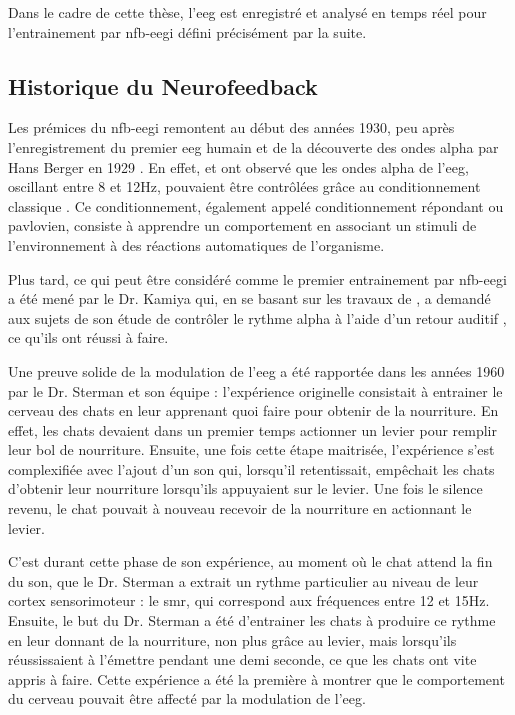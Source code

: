 Dans le cadre de cette thèse, l'\gls{eeg} est enregistré et analysé en temps réel pour l'entrainement par \gls{nfb}-\gls{eegi} défini précisément par la suite.  
 

\subsection{Historique du Neurofeedback}

Les prémices du \gls{nfb}-\gls{eegi} remontent au début des années 1930, peu après l'enregistrement du premier \gls{eeg} humain et de la découverte des ondes alpha par Hans Berger en 1929 \citep{Berger1929}.
En effet, \citet{Durup1935} et \citet{Loomis1936} ont observé que les ondes alpha de l'\gls{eeg}, oscillant entre 8 et 12Hz, pouvaient être contrôlées grâce au 
conditionnement classique \citep{Pavlov1929}. Ce conditionnement, également appelé conditionnement répondant ou pavlovien, consiste à apprendre un comportement en associant un stimuli
de l'environnement à des réactions automatiques de l'organisme.

Plus tard, ce qui peut être considéré comme le premier entrainement par \gls{nfb}-\gls{eegi} a été mené par le Dr. Kamiya qui, en se basant sur les travaux de \citet{Durup1935}, 
a demandé aux sujets de son étude de contrôler le rythme alpha à l'aide d'un retour auditif \citep{Kamiya1969}, ce qu'ils ont réussi à faire. 

Une preuve solide de la modulation de l'\gls{eeg} a été rapportée dans les années 1960 par le Dr. Sterman et son équipe \citep{Sterman1969} : l'expérience 
originelle consistait à entrainer le cerveau des chats en leur apprenant quoi faire pour obtenir de 
la nourriture. En effet, les chats devaient dans un premier temps actionner un levier pour remplir leur bol de nourriture. Ensuite, une fois cette étape maitrisée, 
l'expérience s'est complexifiée avec l'ajout d'un son qui, lorsqu'il retentissait, empêchait les chats d'obtenir leur nourriture lorsqu'ils appuyaient sur le levier.
Une fois le silence revenu, le chat pouvait à nouveau recevoir de la nourriture en actionnant le levier.  

C'est durant cette phase de son expérience, au moment où le chat attend la fin du son, que le Dr. Sterman a extrait un rythme particulier au niveau de leur cortex sensorimoteur : 
le \gls{smr}, qui correspond aux fréquences entre 12 et 15Hz. Ensuite, le but du Dr. Sterman a été d'entrainer les chats à produire ce rythme en leur donnant de la nourriture, non plus grâce 
au levier, mais lorsqu'ils réussissaient à l'émettre pendant une demi seconde, ce que les chats ont vite appris à faire. Cette expérience a été la première à montrer que le comportement
du cerveau pouvait être affecté par la modulation de l'\gls{eeg}. 

